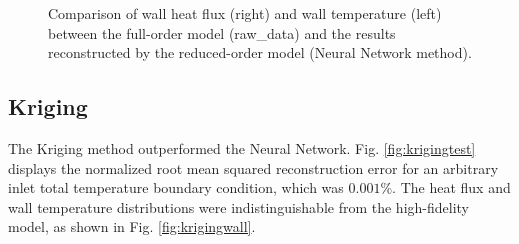 \documentclass[10pt,fleqn,a4paper,twoside]{article}
\begin{document}
\begin{figure}[!ht]%
    \centering
    \qquad
    \caption{Comparison of wall heat flux (right) and wall temperature (left) between the full-order model (raw\_data) and the results reconstructed by the reduced-order model (Neural Network method).}
    \label{fig:onlinewall}%
\end{figure}

\subsection{Kriging}

The Kriging method outperformed the Neural Network. Fig. \ref{fig:krigingtest} displays the normalized root mean squared reconstruction error for an arbitrary inlet total temperature boundary condition, which was $0.001\%$. The heat flux and wall temperature distributions were indistinguishable from the high-fidelity model, as shown in Fig. \ref{fig:krigingwall}.
\end{document}
